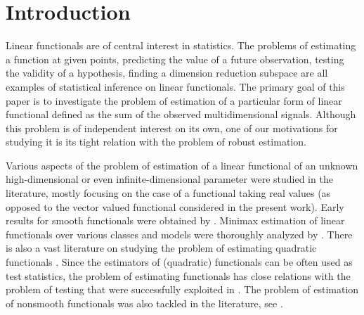 \documentclass[sts,preprint,reqno,a4paper]{imsart}
\theoremstyle{plain}
\theoremstyle{remark}
\theoremstyle{definition}
\begin{document}
\begin{frontmatter}
\begin{abstract}
\end{abstract}

\begin{keyword}[class=MSC]
\end{keyword}

\begin{keyword}
\end{keyword}


\end{frontmatter}


\section{Introduction}

Linear functionals are of central interest in statistics. The problems of
estimating a function at given points, predicting the value of a future
observation, testing the validity of a hypothesis, finding a dimension
reduction  subspace are all examples of statistical inference on linear
functionals. The primary goal of this paper is to investigate the problem
of estimation of a particular form of linear functional defined as the sum
of the observed multidimensional signals. Although this problem is of
independent interest on its own, one of our motivations for studying it
is its tight relation with the problem of robust estimation.

Various aspects of the problem of estimation of a linear functional of an
unknown high-dimensional or even infinite-dimensional parameter were studied
in the literature, mostly focusing on the case of a functional taking real
values (as opposed to the vector valued functional considered in the present work).
Early results  for smooth functionals were obtained by \cite{Koshevnik}.
Minimax estimation of linear functionals over various classes and models
were thoroughly analyzed by \cite{donoho1987minimax, klemela2001,
Efromovich1994,Gol04,cai2004,cai2005, laurent2008,butucea2009,juditsky2009}.
There is also a vast literature on studying the problem of estimating quadratic
functionals \citep{DONOHO1990290,laurent2000,cai2006,BickelRitov}. Since the
estimators of (quadratic) functionals can be often used as test statistics, the
problem of estimating functionals has close relations with the problem of testing
that were successfully exploited in \citep{comminges2012, comminges2013,CD11c,
Lepski1999}. The problem of estimation of nonsmooth functionals was also tackled
in the literature, see \citep{cai2011}.
\end{document}
